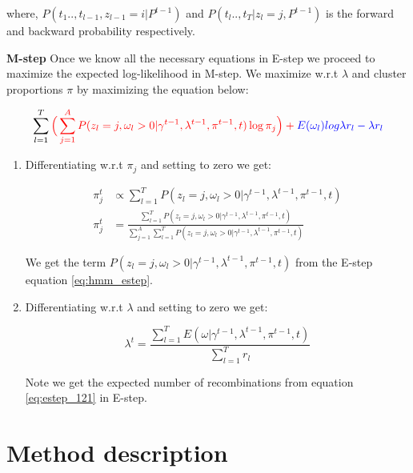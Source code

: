 where, $P(t_1 .., t_{l-1}, z_{l-1}=i \vert P^{t-1})$ and $P(t_{l} .., t_T \vert z_l=j, P^{t-1})$ is the forward and backward probability respectively. 

\textbf{M-step}
Once we know all the necessary equations in E-step we proceed to maximize the expected log-likelihood in M-step. We maximize w.r.t $\lambda$ and cluster proportions $\pi$ by maximizing the equation below: 

\begin{equation}
    \sum\limits_{l=1}^{T}  \color{red}{ \Big( \sum\limits_{j=1}^{A} P(z_l = j, \omega_l > 0 \vert \gamma^{t-1}, \lambda^{t-1}, \pi^{t-1}, t) \log \pi_j} \Big) + \color{blue}{E(\omega_l) log \lambda r_l - \lambda r_l }
\end{equation}

\begin{enumerate}
    \item Differentiating w.r.t $\pi_j$ and setting to zero we get:
    
    \begin{align}
        \pi^{t}_j &\propto \sum\limits_{l=1}^{T} P(z_l = j, \omega_l > 0 \vert \gamma^{t-1}, \lambda^{t-1}, \pi^{t-1}, t) \nonumber \\
        \pi^{t}_j &= \frac{\sum\limits_{l=1}^{T} P(z_l = j, \omega_l > 0 \vert \gamma^{t-1}, \lambda^{t-1}, \pi^{t-1}, t)}{\sum\limits_{j=1}^{A} \sum\limits_{l=1}^{T} P(z_l = j, \omega_l > 0 \vert \gamma^{t-1}, \lambda^{t-1}, \pi^{t-1}, t)}
    \end{align}
    
    We get the term $P(z_l = j, \omega_l > 0 \vert \gamma^{t-1}, \lambda^{t-1}, \pi^{t-1}, t)$ from the E-step equation \ref{eq:hmm_estep}. 
    \item Differentiating w.r.t $\lambda$ and setting to zero we get:
    
    \begin{equation}
        \lambda^t = \frac{\sum\limits_{l=1}^{T}E(\omega \vert \gamma^{t-1}, \lambda^{t-1}, \pi^{t-1}, t)}{\sum\limits_{l=1}^{T}r_l}
    \end{equation}
    
    Note we get the expected number of recombinations from equation \ref{eq:estep_121} in E-step.
    
\end{enumerate}

\section{Method description}
\label{sec:ch2-gb-method}
